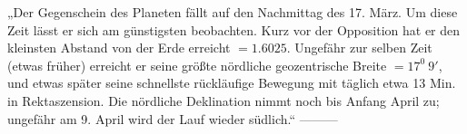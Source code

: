 „Der Gegenschein des Planeten fällt auf den Nachmittag des 17. März. Um diese Zeit lässt er sich am günstigsten beobachten. Kurz vor der Opposition hat er den kleinsten Abstand von der Erde
%
erreicht $=1.6025$. Ungefähr zur selben Zeit (etwas früher) erreicht er seine größte nördliche geozentrische Breite $=17^0\ 9'$, und etwas später seine schnellste rückläufige Bewegung mit täglich etwa 13 Min. in Rektaszension. Die nördliche Deklination nimmt noch bis Anfang April zu; ungefähr am 9. April wird der Lauf wieder südlich.“ —\quad —\quad —
\begin{flushright}\end{flushright}

